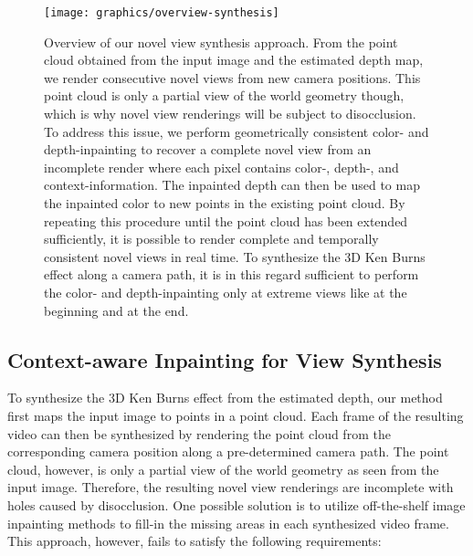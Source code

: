 \documentclass[acmtog,authorversion]{acmart}
\begin{document}
\begin{figure*}\centering
    \texttt{[image: graphics/overview-synthesis]}\vspace{-0.0cm}
    \caption{Overview of our novel view synthesis approach. From the point cloud obtained from the input image and the estimated depth map, we render consecutive novel views from new camera positions. This point cloud is only a partial view of the world geometry though, which is why novel view renderings will be subject to disocclusion. To address this issue, we perform geometrically consistent color- and depth-inpainting to recover a complete novel view from an incomplete render where each pixel contains color-, depth-, and context-information. The inpainted depth can then be used to map the inpainted color to new points in the existing point cloud. By repeating this procedure until the point cloud has been extended sufficiently, it is possible to render complete and temporally consistent novel views in real time. To synthesize the 3D Ken Burns effect along a camera path, it is in this regard sufficient to perform the color- and depth-inpainting only at extreme views like at the beginning and at the end.}\vspace{-0.2cm}
    \label{fig:overview-synthesis}
\end{figure*}

\subsection{Context-aware Inpainting for View Synthesis}

To synthesize the 3D Ken Burns effect from the estimated depth, our method first maps the input image to points in a point cloud. Each frame of the resulting video can then be synthesized by rendering the point cloud from the corresponding camera position along a pre-determined camera path. The point cloud, however, is only a partial view of the world geometry as seen from the input image. Therefore, the resulting novel view renderings are incomplete with holes caused by disocclusion. One possible solution is to utilize off-the-shelf image inpainting methods to fill-in the missing areas in each synthesized video frame. This approach, however, fails to satisfy the following requirements:
\end{document}
